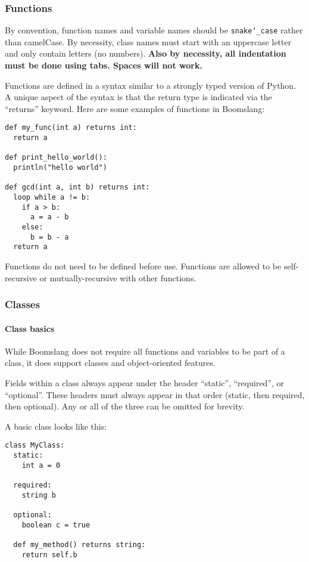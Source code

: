 \documentclass{article}
\begin{document}
\subsubsection{Functions}
By convention, function names and variable names should be \texttt{snake\char`_case} rather than camelCase. By necessity, class names must start with an uppercase letter and only contain letters (no numbers). \textbf{Also by necessity, all indentation must be done using tabs. Spaces will not work.}

Functions are defined in a syntax similar to a strongly typed version of Python. A unique aspect of the syntax is that the return type is indicated via the ``returns'' keyword. Here are some examples of functions in Boomslang:
\begin{verbatim}
def my_func(int a) returns int:
  return a

def print_hello_world():
  println("hello world")
    
def gcd(int a, int b) returns int:
  loop while a != b:
    if a > b:
      a = a - b
    else:
      b = b - a
  return a
\end{verbatim}

Functions do not need to be defined before use. Functions are allowed to be self-recursive or mutually-recursive with other functions.

\subsubsection{Classes}
\paragraph{Class basics}
While Boomslang does not require all functions and variables to be part of a class, it does support classes and object-oriented features.

Fields within a class always appear under the header ``static'', ``required'', or ``optional''. These headers must always appear in that order (static, then required, then optional). Any or all of the three can be omitted for brevity.

A basic class looks like this:
\begin{verbatim}
class MyClass:
  static:
    int a = 0

  required:
    string b

  optional:
    boolean c = true
   
  def my_method() returns string:
    return self.b
\end{verbatim}
\end{document}
